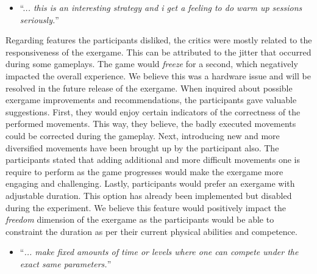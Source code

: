 \begin{itemize}
\item ``.\textit{.. this is an interesting strategy and i get a feeling to do warm up sessions seriously.}''
\end{itemize}
Regarding features the participants disliked, the critics were mostly related to the responsiveness of the exergame. This can be attributed to the jitter that occurred during some gameplays. The game would \textit{freeze} for a second, which negatively impacted the overall experience. We believe this was a hardware issue and  will be resolved in the future release of the exergame. When inquired about possible exergame improvements and recommendations, the participants gave valuable suggestions. First, they would enjoy certain indicators of the correctness of the performed movements. This way, they believe, the badly executed movements could be corrected during the gameplay. Next, introducing new and more diversified movements have been brought up by the participant also. The participants stated that adding additional and more difficult movements one is require to perform as the game progresses would make the exergame more engaging and challenging. Lastly, participants would prefer an exergame with adjustable duration. This option has already been implemented but disabled during the experiment. We believe this feature would positively impact the \textit{freedom} dimension of the exergame as the participants would be able to constraint the duration as per their current physical abilities and competence.
\begin{itemize}
\item ``\textit{... make fixed amounts of time or levels where one can compete under the exact same parameters.}''
\end{itemize}

